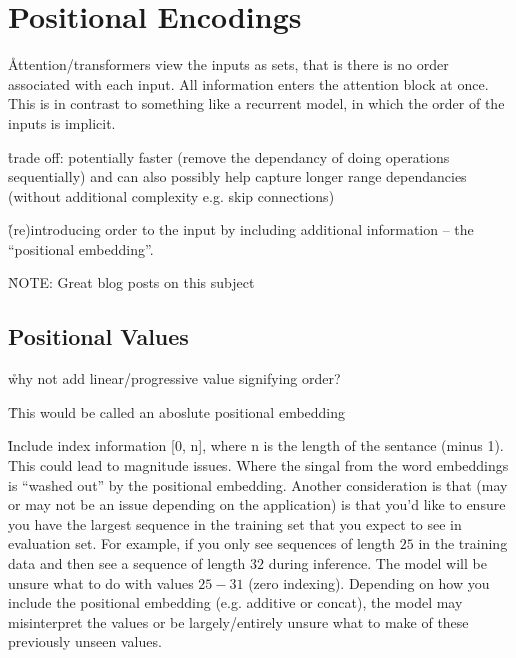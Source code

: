 \chapter{Positional Encodings}



\r{Attention/transformers view the inputs as sets, that is there is no order associated with each input. All information enters the attention block at once. This is in contrast to something like a recurrent model, in which the order of the inputs is implicit.}

\r{trade off: potentially faster (remove the dependancy of doing operations sequentially) and can also possibly help capture longer range dependancies (without additional complexity e.g. skip connections)}

\r{(re)introducing order to the input by including additional information -- the ``positional embedding''.}

\r{NOTE: Great blog posts on this subject~\cite{kazemnejad_2021, kernes_2021, kernes_2021B}}

\section{Positional Values}

\r{why not add linear/progressive value signifying order?}

\r{This would be called an aboslute positional embedding}

\r{Include index information [0, n], where n is the length of the sentance (minus 1). This could lead to magnitude issues. Where the singal from the word embeddings is ``washed out'' by the positional embedding.  Another consideration is that (may or may not be an issue depending on the application) is that you'd like to ensure you have the largest sequence in the training set that you expect to see in evaluation set. For example, if you only see sequences of length $25$ in the training data and then see a sequence of length $32$ during inference. The model will be unsure what to do with values $25 - 31$ (zero indexing). Depending on how you include the positional embedding (e.g. additive or concat), the model may misinterpret the values or be largely/entirely unsure what to make of these previously unseen values.}


